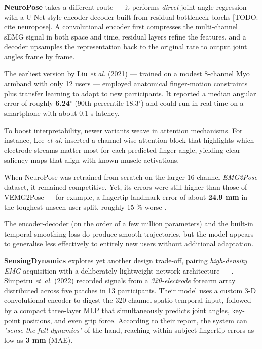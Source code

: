 \textbf{NeuroPose} takes a different route — it performs \emph{direct} joint-angle regression with a U-Net-style encoder-decoder built from residual bottleneck blocks [TODO: cite neuropose]. A convolutional encoder first compresses the multi-channel sEMG signal in both space and time, residual layers refine the features, and a decoder upsamples the representation back to the original rate to output joint angles frame by frame.

The earliest version by Liu \textit{et al.} (2021) — trained on a modest 8-channel Myo armband with only 12 users — employed anatomical finger-motion constraints plus transfer learning to adapt to new participants. It reported a median angular error of roughly \textbf{6.24$^\circ$} (90th percentile 18.3$^\circ$) and could run in real time on a smartphone with about 0.1 s latency.

To boost interpretability, newer variants weave in attention mechanisms. For instance, Lee \textit{et al.} \cite{lee2022explainable} inserted a channel-wise attention block that highlights which electrode streams matter most for each predicted finger angle, yielding clear saliency maps that align with known muscle activations.

When NeuroPose was retrained from scratch on the larger 16-channel \textit{EMG2Pose} dataset, it remained competitive. Yet, its errors were still higher than those of VEMG2Pose — for example, a fingertip landmark error of about \textbf{24.9 mm} in the toughest unseen-user split, roughly 15 \% worse \cite{salter2024emg2pose}.

The encoder-decoder (on the order of a few million parameters) and the built-in temporal-smoothing loss do produce smooth trajectories, but the model appears to generalise less effectively to entirely new users without additional adaptation.

\textbf{SensingDynamics} explores yet another design trade-off, pairing \textit{high-density EMG} acquisition with a deliberately lightweight network architecture — \cite{simpetru10sensing}.
S\^{i}mpetru \textit{et~al.} (2022) recorded signals from a \textit{320-electrode} forearm array distributed across five patches in 13 participants. Their model uses a custom 3-D convolutional encoder to digest the 320-channel spatio-temporal input, followed by a compact three-layer MLP that simultaneously predicts joint angles, key-point positions, and even grip force. According to their report, the system can \emph{"sense the full dynamics"} of the hand, reaching within-subject fingertip errors as low as \textbf{3 mm} (MAE).

